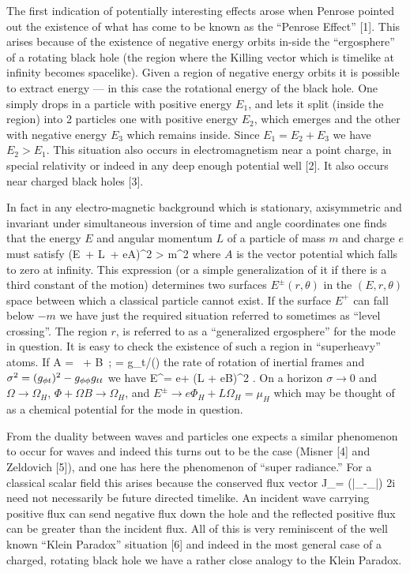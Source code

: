 The first indication of potentially interesting effects arose when Penrose pointed out 
the existence of what has come to be known as the ``Penrose Effect'' [1]. 
This arises because of the existence of negative energy orbits in-side the ``ergosphere''
of a rotating black hole (the region where the Killing vector which is timelike at
infinity becomes spacelike). Given a region of negative energy orbits it is possible to
extract energy --- in this case the rotational energy of the black hole. 
One simply drops in a particle with positive energy $E_1$, and lets it split (inside the region) into 
2 particles one with positive energy
$E_2$, which emerges and the other with negative energy $E_3$ which remains inside.
Since $E_1 = E_2 + E_3$ we have $E_2 > E_1$. This situation also occurs in electromagnetism
near a point charge, in special relativity or indeed in any deep enough potential well [2].
It also occurs near charged black holes [3].

In fact in any electro-magnetic background which is stationary, axisymmetric and
invariant under simultaneous inversion of time and angle coordinates one finds that the
energy $E$ and angular momentum $L$ of a particle of mass $m$ and charge $e$ must satisfy
\be
(E\, \dt + L\, \dphi + eA)^2 > m^2
\ee
where $A$ is the vector potential which falls to zero at infinity.
This expression (or a simple generalization of it if there is a third constant of the motion)
determines two surfaces $E^{\pm} (r,\theta)$ in the $(E, r, \theta)$ space between which
a classical particle cannot exist. If the surface $E^+$ can fall below $- m$ we have just the
required situation referred to sometimes as ``level crossing''. The region $r$,
is referred to as a ``generalized ergosphere'' for the mode in question.
It is easy to check the existence of such a region in ``superheavy'' atoms. If
\be
A = \Phi\, \dt + B\, \dphi; \quad \Omega = g_{\phi t}/(\gtt)
\ee
the rate of rotation of inertial frames and $\sigma^2 = (g_{\phi t})^2 - g_{\phi\phi}g_{tt}$ we have
\be
E^\pm = e\Phi + (L + eB)\Omega \pm \sigma^2  .
\ee
\ni
On a horizon $\sigma\rightarrow 0$ and $\Omega \rightarrow \Omega_H$, $\Phi + \Omega B \rightarrow \Omega_H$, and
$E^\pm \rightarrow e \Phi_H + L \Omega_H = \mu_H$
which may be thought of as a chemical potential for the mode in question.

From the duality between waves and particles one expects a similar phenomenon to occur for waves and indeed this turns out to be the case (Misner [4] and Zeldovich [5]), and one has here the phenomenon of ``super radiance.'' For a classical scalar ﬁeld this arises because the conserved flux vector
\be
J_\mu = {(\bar\phi\grad_{\!\mu}\phi-\phi\grad_{\!\mu}\bar\phi) \over 2i}
\ee
need not necessarily be future directed timelike. An incident wave carrying positive flux can send negative flux down the hole and the reflected positive flux can be greater than the incident flux. All of this is very reminiscent of the well known ``Klein Paradox'' situation [6] and indeed in the most general case of a charged, rotating black hole we have a rather close analogy to the Klein Paradox. 

